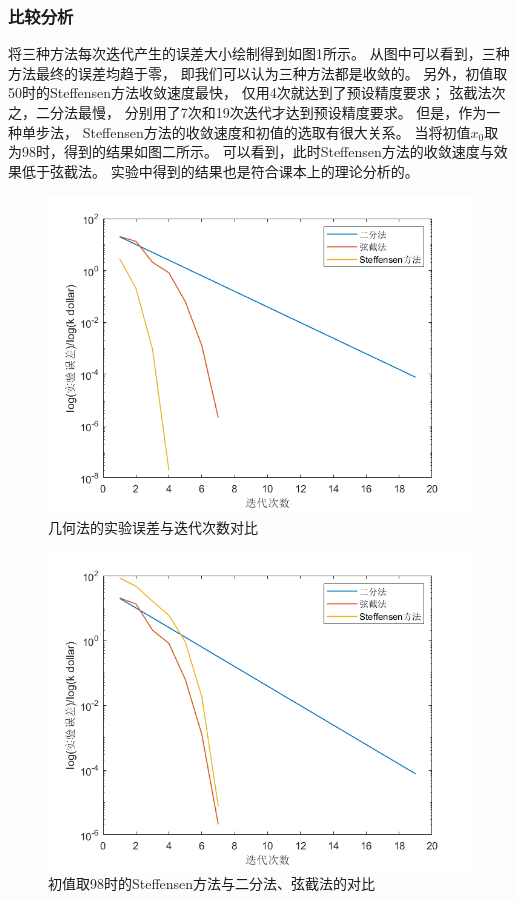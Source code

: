 \documentclass[12pt,a4paper]{article}
\begin{document}
\subsubsection{比较分析}
将三种方法每次迭代产生的误差大小绘制得到如图1所示。
从图中可以看到，三种方法最终的误差均趋于零，
即我们可以认为三种方法都是收敛的。
另外，初值取50时的Steffensen方法收敛速度最快，
仅用4次就达到了预设精度要求；
弦截法次之，二分法最慢，
分别用了7次和19次迭代才达到预设精度要求。
但是，作为一种单步法，
Steffensen方法的收敛速度和初值的选取有很大关系。
当将初值$x_0$取为98时，得到的结果如图二所示。
可以看到，此时Steffensen方法的收敛速度与效果低于弦截法。
实验中得到的结果也是符合课本上的理论分析的。
\begin{figure}
    \centering
    \includegraphics[scale=0.6]{pic01.png}
    \caption{几何法的实验误差与迭代次数对比}
    \label{fig:1}
\end{figure}
\begin{figure}
    \centering
    \includegraphics[scale=0.6]{pic02.png}
    \caption{初值取98时的Steffensen方法与二分法、弦截法的对比}
    \label{fig:2}
\end{figure}
\end{document}
